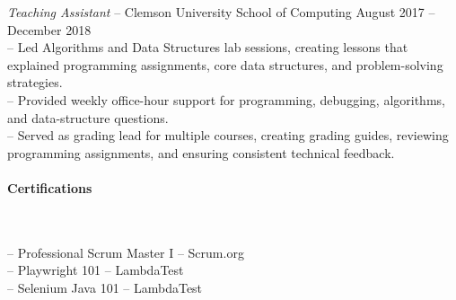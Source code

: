 \documentclass{article}
\begin{document}
	\hangindent=0.2in
	\textit{Teaching Assistant} -- Clemson University School of Computing \hfill August 2017 -- December 2018 \\
    -- Led Algorithms and Data Structures lab sessions, creating lessons that explained programming assignments, core data structures, and problem-solving strategies. \\
    -- Provided weekly office-hour support for programming, debugging, algorithms, and data-structure questions. \\
    -- Served as grading lead for multiple courses, creating grading guides, reviewing programming assignments, and ensuring consistent technical feedback.

	\paragraph{Certifications} $ $

	\setlength{\parindent}{0.2in}
	\hangindent=0.2in
	-- Professional Scrum Master I -- Scrum.org \\
	-- Playwright 101 -- LambdaTest \\
    -- Selenium Java 101 -- LambdaTest




\end{document}
